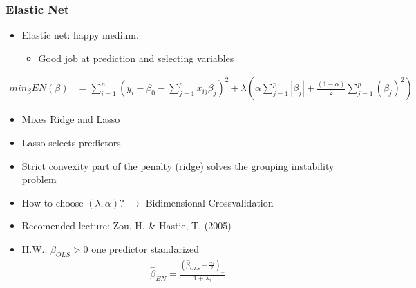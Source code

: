 \documentclass[
  shownotes,
  xcolor={svgnames},
  hyperref={colorlinks,citecolor=DarkBlue,linkcolor=andesred,urlcolor=DarkBlue}
  , aspectratio=169]{beamer}
\begin{document}
\begin{frame}[fragile]
\frametitle{Elastic Net}

\begin{itemize}
\item Elastic net: happy medium. 
  \begin{itemize}
    \item Good job at prediction and selecting variables
  \end{itemize}
\end{itemize}

\begin{align}
min_{\beta} EN(\beta) &= \sum_{i=1}^n (y_i-\beta_0 - \sum_{j=1}^p x_{ij}\beta_j)^2  + \lambda\left(\alpha \sum_{j=1}^p |\beta_j| + \frac{(1-\alpha)}{2} \sum_{j=1}^p (\beta_j)^2\right)
\end{align}


\begin{itemize}
 \item Mixes Ridge and Lasso
 \item Lasso selects predictors
 \item Strict convexity part  of the penalty (ridge) solves the grouping instability problem 
 \item How to choose $(\lambda,\alpha)$? $\rightarrow$ Bidimensional Crossvalidation
 
 \scriptsize
 \item Recomended lecture: Zou, H. \& Hastie, T. (2005)
 \item H.W.: $\beta_{OLS}>0$ one predictor standarized
 \begin{align}
\hat{\beta}_{EN}= \frac{\left(\hat{\beta}_{OLS}-\frac{\lambda_1}{2}\right)_{+}}{1+\lambda_2}
\end{align}
\end{itemize}

\end{frame}
\end{document}
